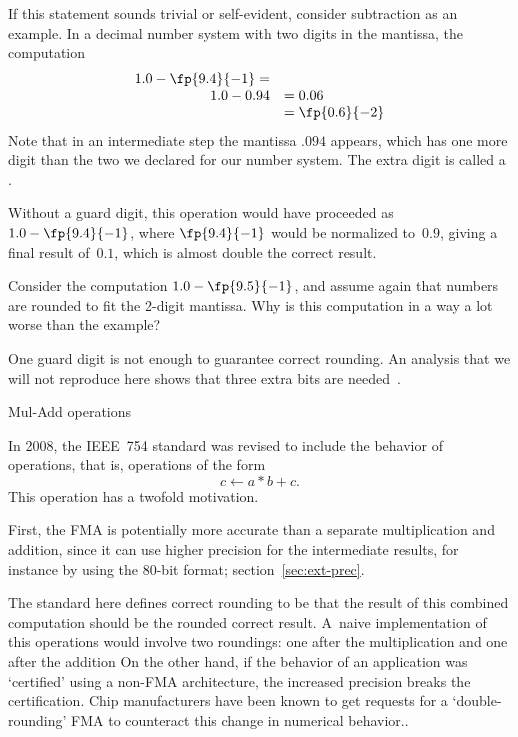 If this statement sounds trivial or self-evident, consider subtraction
as an example. In a decimal number system with two digits in the
mantissa, the computation
\begin{equation}
\begin{array}{rl}
  1.0-\fp{9.4}{-1}=\\ 1.0-0.94&=0.06\\&=\fp{0.6}{-2}\\
\end{array}
\end{equation}
Note that in an
intermediate step the mantissa $.094$ appears, which has one more
digit than the two we declared for our number system. The extra digit
is called a .

Without a guard digit, this operation would have proceeded as
$1.0-\fp{9.4}{-1}$, where $\fp{9.4}{-1}$ would be normalized to~$0.9$,
giving a final result of~$0.1$, which is almost double the correct result.
\begin{exercise}
  Consider the computation $1.0-\fp{9.5}{-1}$, and assume again that
  numbers are rounded to fit the 2-digit mantissa. Why is this
  computation in a way a lot worse than the example?
\end{exercise}
One guard digit is not enough to guarantee correct rounding. An
analysis that we will not reproduce here shows that three extra bits
are needed~\cite{Goldberg:arithmetic}.

 {Mul-Add operations}

In 2008, the IEEE~754 standard was revised to include the behavior
of  operations, that is, operations of the
form \begin{equation}
  c \leftarrow a*b+c.
\end{equation}
This operation has a twofold motivation.

First, the \ac{FMA} is potentially more accurate than a separate
multiplication and addition, since it can use higher precision for the
intermediate results, for instance by using the 80-bit
 format;
section~\ref{sec:ext-prec}.

The standard here defines correct rounding to be that the result of
this combined computation should be the rounded correct
result. A~naive implementation of this operations would involve two
roundings: one after the multiplication and one after the
addition\footnoteenv
{On the other hand, if the behavior of an
  application was `certified' using a non-FMA architecture, the
  increased precision breaks the certification. Chip manufacturers
  have been known to get requests for a `double-rounding' FMA to
  counteract this change in numerical behavior.}.

